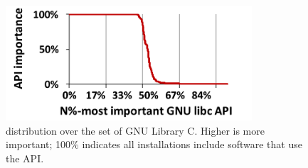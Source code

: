 


\begin{figure}[t]
\centering
\includegraphics[width=3.6in]{syspop/figures/libc-popularity.pdf}
\caption[\Usagemetric{} distribution of GNU Library C functions]
{\usagemetric{} distribution over the set of GNU Library C. Higher is more important; 100\% indicates all installations include software that use the \libc{} API. }
\label{fig:libc-popularity}
\end{figure}


